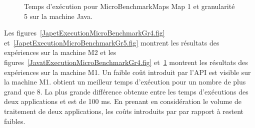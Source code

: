 \begin{figure}[H]
\centering
    \caption{Temps d'ex\'ecution pour MicroBenchmarkMaps Map 1 et granularit\'e 5 sur la machine Java.}
    \label{JavaExecutionMicroBenchmarkGr5.fig}	
\end{figure}


Les figures~\ref{JapetExecutionMicroBenchmarkGr4.fig} et~\ref{JapetExecutionMicroBenchmarkGr5.fig} montrent les r\'esultats des exp\'eriences sur la machine M2 et les figures~\ref{JavatExecutionMicroBenchmarkGr4.fig} et~\ref{JavaExecutionMicroBenchmarkGr5.fig} montrent les r\'esultats des exp\'eriences sur la machine M1. Un faible co\^ut introduit par l'API est visible sur la machine M1.  obtient un meilleur temps d'ex\'ecution pour un nombre de  plus grand que 8. La plus grande diff\'erence obtenue entre les temps d'ex\'ecutions des deux applications  et  est de 100 ms. En prenant en consid\'eration le volume de traitement de deux applications, les co\^uts introduits par  par rapport \`a  restent faibles.




